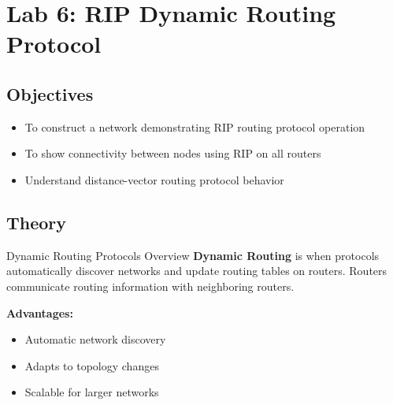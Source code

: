 \documentclass[12pt,a4paper]{article}
\begin{document}
\newpage

\section{Lab 6: RIP Dynamic Routing Protocol}

\subsection{Objectives}
\begin{itemize}[noitemsep]
    \item To construct a network demonstrating RIP routing protocol operation
    \item To show connectivity between nodes using RIP on all routers
    \item Understand distance-vector routing protocol behavior
\end{itemize}

\subsection{Theory}

\begin{theorybox}{Dynamic Routing Protocols Overview}
\textbf{Dynamic Routing} is when protocols automatically discover networks and update routing tables on routers. Routers communicate routing information with neighboring routers.

\vspace{0.3cm}
\textbf{Advantages:}
\begin{itemize}[noitemsep]
    \item Automatic network discovery
    \item Adapts to topology changes
    \item Scalable for larger networks
\end{itemize}
\end{theorybox}
\end{document}
